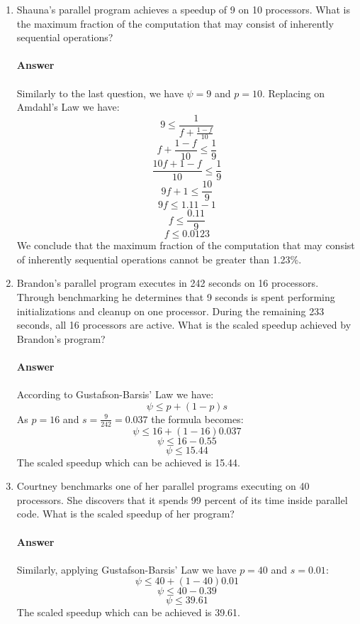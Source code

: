 \documentclass[10pt]{scrartcl}
\begin{document}
\begin{enumerate}
 \item Shauna's parallel program achieves a speedup of 9 on 10 processors. What is the maximum fraction of the computation that may consist of inherently sequential operations?\\
 \\ 
 \textbf{Answer}\\
 \\
 Similarly to the last question, we have $\psi=9$ and $p=10$.  Replacing on Amdahl's Law we have:
 $$ 9 \leq \frac{1}{f + \frac{1 - f}{10}} $$
 $$ f + \frac{1 - f}{10} \leq \frac{1}{9} $$
 $$ \frac{10f + 1 - f}{10} \leq \frac{1}{9} $$
 $$ 9f + 1 \leq \frac{10}{9} $$
 $$ 9f \leq 1.11 - 1 $$
 $$ f \leq \frac{0.11}{9} $$
 $$ f \leq 0.0123 $$
 We conclude that the maximum fraction of the computation that may consist of inherently sequential operations cannot be greater than 1.23\%.
 
 \item Brandon's parallel program executes in 242 seconds on 16 processors. Through benchmarking he determines that 9 seconds is spent performing initializations and cleanup on one processor. During the remaining 233 seconds, all 16 processors are active. What is the scaled speedup achieved by Brandon's program?\\
 \\ 
 \textbf{Answer}\\
 \\
 According to Gustafson-Barsis' Law we have:
 $$\psi \leq p + (1 - p)s$$
 As $p=16$ and $s=\frac{9}{242} = 0.037$ the formula becomes:
 $$\psi \leq 16 + (1 - 16)0.037$$
 $$\psi \leq 16 - 0.55$$
 $$\psi \leq 15.44$$
 The scaled speedup which can be achieved is 15.44. 
 
 \item Courtney benchmarks one of her parallel programs executing on 40 processors. She discovers that it spends 99 percent of its time inside parallel code. What is the scaled speedup of her program?\\
 \\ 
 \textbf{Answer}\\
 \\
 Similarly, applying Gustafson-Barsis' Law we have $p=40$ and $s=0.01$:
 $$\psi \leq 40 + (1 - 40)0.01$$
 $$\psi \leq 40 - 0.39$$
 $$\psi \leq 39.61$$
 The scaled speedup which can be achieved is 39.61. 
 

\end{enumerate}
\end{document}
